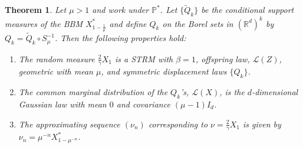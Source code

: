 \documentclass[12pt]{article}
\newtheorem{theorem}{Theorem}
\numberwithin{theorem}{section}
\theoremstyle{def}
\numberwithin{equation}{section}
\renewcommand{\P}{\mathbb{P}}
\newcommand{\R}{\mathbb{R}}
\newcommand{\cL}{\mathcal{L}}
\begin{document}
\begin{theorem}\label{thm:SBMSTRM}
Let $\mu>1$ and work under $\P^*$. 
Let $\{\tilde Q_k\}$ be the conditional support measures of the BBM $X^*_{1-\frac{1}{\mu}}$ and define $Q_k$ on the Borel sets in $(\R^d)^k$ by $Q_k=\tilde Q_k\circ S_{\mu}^{-1}$.  
Then the following properties hold:
\begin{enumerate}[label=(\alph*)]
	\item The random measure $\frac{2}{\gamma}X_1$ is a STRM with $\beta=1$, offspring law, $\cL(Z)$, geometric with mean $\mu$, and symmetric displacement laws $\{Q_k\}$.
	\item  The common marginal distribution of the $Q_k$'s, $\cL(X)$, is the $d$-dimensional Gaussian law with mean $0$ and covariance $(\mu-1)I_d$. 
	\item  The approximating sequence $(\nu_n)$ corresponding to $\nu=\frac{2}{\gamma}X_1$ is given by $\nu_n=\mu^{-n}X^*_{1-\mu^{-n}}$.
\end{enumerate}
\end{theorem}
\end{document}
